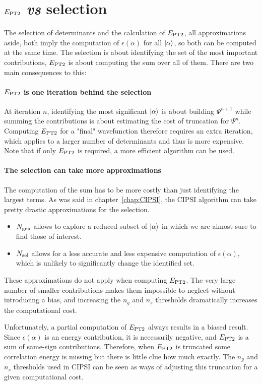 \documentclass[./thesis.tex]{subfiles}
\begin{document}
\label{chap:PT2}
\section{$E_\text{PT2}$ \textit{vs} selection}

The selection of determinants and the calculation of $E_\text{PT2}$, all approximations aside, both imply the computation of $\epsilon(\alpha)$ for all $\ket \alpha$, so both can be computed at the same time. The selection is about identifying the set of the most important contributions, $E_\text{PT2}$ is about computing the sum over all of them. There are two main consequences to this:
\paragraph{$E_\text{PT2}$ is one iteration behind the selection}
At iteration $n$, identifying the most significant $\ket \alpha$ is about building $\Psi^{n+1}$ while summing the contributions is about estimating the cost of truncation for $\Psi^{n}$. Computing $E_\text{PT2}$ for a "final" wavefunction therefore requires an extra iteration, which applies to a larger number of determinants and thus is more expensive. Note that if only $E_\text{PT2}$ is required, a more efficient algorithm can be used.\cite{Cimiraglia_1996}

\paragraph{The selection can take more approximations}
The computation of the sum has to be more costly than just identifying the largest terms. As was said in chapter~\ref{chap:CIPSI}, the CIPSI algorithm can take pretty drastic approximations for the selection.\cite{Evangelisti_1983}
	\begin{itemize}
		\item{${N_\text{gen}}$}
		allows to explore a reduced subset of $\ket \alpha$ in which we are almost sure to find those of interest.
		\item{${N_\text{sel}}$}
		allows for a less accurate and less expensive computation of $\epsilon(\alpha)$, which is unlikely to significantly change the identified set.
	\end{itemize}
	These approximations do not apply when computing $E_\text{PT2}$. The very large number of smaller contributions makes them impossible to neglect without introducing a bias, and increasing the $n_g$ and $n_s$ thresholds dramatically increases the computational cost.


Unfortunately, a partial computation of $E_\text{PT2}$ always results in a biased result. Since $\epsilon(\alpha)$ is an energy contribution, it is necessarily negative, and $E_\text{PT2}$ is a sum of same-sign contributions. Therefore, when $E_\text{PT2}$ is truncated some correlation energy is missing but there is little clue how much exactly. The $n_g$ and $n_s$ thresholds used in CIPSI can be seen as ways of adjusting this truncation for a given computational cost.
\end{document}
